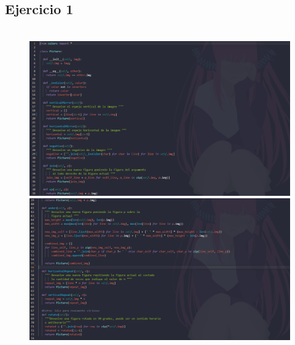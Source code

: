 \documentclass{article}
\begin{document}
	\subsection{Ejercicio 1}
	\begin{figure}[H]
		\centering
		\
		\includegraphics[width=1.0\textwidth, keepaspectratio]{img/ejercicio1a}
		\includegraphics[width=1.0\textwidth, keepaspectratio]{img/ejercicio1b}
	\end{figure}
	
\end{document}
